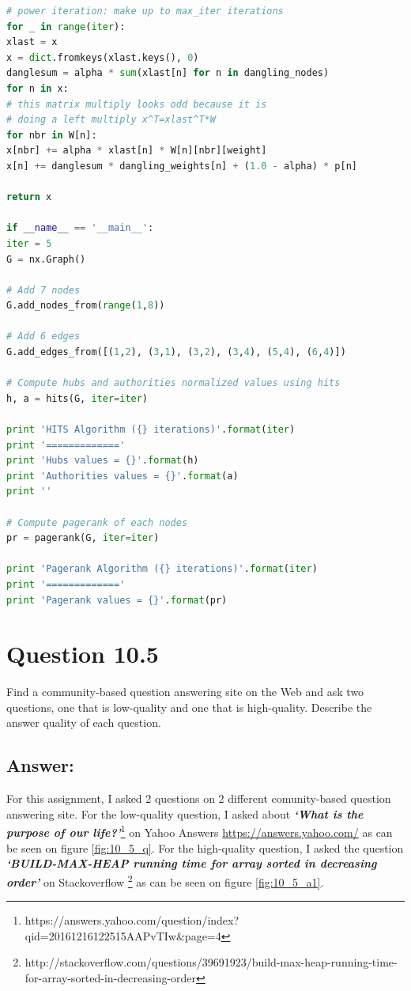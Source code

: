 \documentclass[letterpaper,11pt]{article}
\begin{document}
\begin{lstlisting}[language=python, caption={Computing HITS and PageRank}, label={lst:10_3.py}]
# power iteration: make up to max_iter iterations
for _ in range(iter):
xlast = x
x = dict.fromkeys(xlast.keys(), 0)
danglesum = alpha * sum(xlast[n] for n in dangling_nodes)
for n in x:
# this matrix multiply looks odd because it is
# doing a left multiply x^T=xlast^T*W
for nbr in W[n]:
x[nbr] += alpha * xlast[n] * W[n][nbr][weight]
x[n] += danglesum * dangling_weights[n] + (1.0 - alpha) * p[n]

return x

if __name__ == '__main__':
iter = 5
G = nx.Graph()

# Add 7 nodes
G.add_nodes_from(range(1,8))

# Add 6 edges
G.add_edges_from([(1,2), (3,1), (3,2), (3,4), (5,4), (6,4)])

# Compute hubs and authorities normalized values using hits
h, a = hits(G, iter=iter)

print 'HITS Algorithm ({} iterations)'.format(iter)
print '============='
print 'Hubs values = {}'.format(h)
print 'Authorities values = {}'.format(a)
print ''

# Compute pagerank of each nodes
pr = pagerank(G, iter=iter)

print 'Pagerank Algorithm ({} iterations)'.format(iter)
print '============='
print 'Pagerank values = {}'.format(pr)

\end{lstlisting}



\noindent\makebox[\linewidth]{\rule{\textwidth}{0.4pt}}

\section*{Question 10.5}
\begin{spverbatim}
Find a community-based question answering site on the Web and ask two questions, one that is low-quality and one that is high-quality. Describe the answer quality of each question.
\end{spverbatim}

\subsection*{Answer:}
For this assignment, I asked 2 questions on 2 different comunity-based question answering site. For the low-quality question, I asked about \textbf{\textit{`What is the purpose of our life?'}}\footnote{https://answers.yahoo.com/question/index?qid=20161216122515AAPvTIw\&page=4} on Yahoo Answers \url{https://answers.yahoo.com/} as can be seen on figure \ref{fig:10_5_q}. For the high-quality question, I asked the question \textbf{\textit{`BUILD-MAX-HEAP running time for array sorted in decreasing order'}} on Stackoverflow \footnote{http://stackoverflow.com/questions/39691923/build-max-heap-running-time-for-array-sorted-in-decreasing-order} as can be seen on figure \ref{fig:10_5_a1}.
\end{document}
